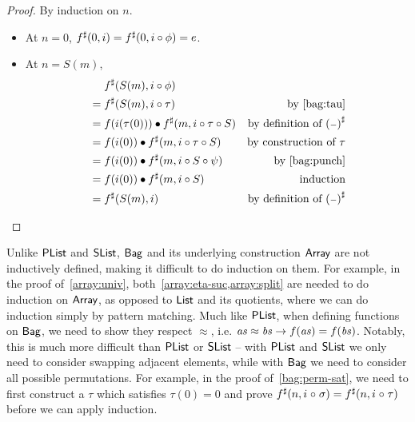\begin{proof}
    By induction on $n$.
    \begin{itemize}
        \item At $n = 0$, $\ext{f}(0, i) \id \ext{f}(0, i \circ \phi) = e$.
        \item At $n = S(m)$,
              \begin{align*}
                   & \mathrel{\phantom{=}} \ext{f}(S(m), i \circ \phi)                                                 \\
                   & = \ext{f}(S(m), i \circ \tau)                          & \text{by~\cref{bag:tau}}                 \\
                   & = f(i(\tau(0))) \mult \ext{f}(m, i \circ \tau \circ S) & \text{by definition of $\ext{(\blank)}$} \\
                   & = f(i(0)) \mult \ext{f}(m, i \circ \tau \circ S)       & \text{by construction of $\tau$}         \\
                   & = f(i(0)) \mult \ext{f}(m, i \circ S \circ \psi)       & \text{by~\cref{bag:punch}}               \\
                   & = f(i(0)) \mult \ext{f}(m, i \circ S)                  & \text{induction}                         \\
                   & = \ext{f}(S(m), i)                                     & \text{by definition of $\ext{(\blank)}$}
              \end{align*}
    \end{itemize}
\end{proof}
%
Unlike $\operatorname{\mathsf{PList}}$ and $\operatorname{\mathsf{SList}}$, $\operatorname{\mathsf{Bag}}$ and its underlying construction $\operatorname{\mathsf{Array}}$ are not inductively defined,
making it difficult to do induction on them. For example,
in the proof of~\cref{array:univ}, both~\cref{array:eta-suc,array:split} are needed to do
induction on $\operatorname{\mathsf{Array}}$, as opposed to $\operatorname{\mathsf{List}}$ and its quotients, where we can do induction simply by
pattern matching. Much like $\operatorname{\mathsf{PList}}$, when defining functions on $\operatorname{\mathsf{Bag}}$, we need to show they respect
$\approx$, i.e. $\mathit{as} \approx \mathit{bs} \to f(\mathit{as}) = f(\mathit{bs})$. Notably, this is much more difficult than
$\operatorname{\mathsf{PList}}$ or $\operatorname{\mathsf{SList}}$ -- with $\operatorname{\mathsf{PList}}$ and $\operatorname{\mathsf{SList}}$ we only need to consider swapping adjacent elements,
while with $\operatorname{\mathsf{Bag}}$ we need to consider all possible permutations. For example,
in the proof of~\cref{bag:perm-sat}, we need to first construct a $\tau$ which satisfies $\tau(0) = 0$ and prove
${f}^{\sharp}(n, i \mathrel{\circ} \sigma) = {f}^{\sharp}(n, i \mathrel{\circ} \tau)$ before we can apply induction.

